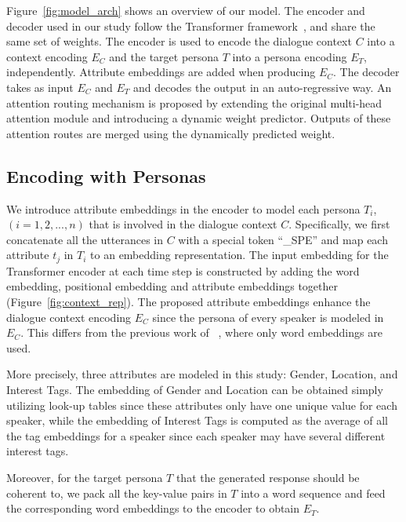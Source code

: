 \documentclass[letterpaper]{article}
\newcommand{\citet}[1]{\citeauthor{#1} \shortcite{#1}}
\newcommand{\citep}{\cite}
\begin{document}
Figure~\ref{fig:model_arch} shows an overview of our model. The encoder and decoder used in our study follow the Transformer framework~\citep{Vaswani2017Attention}, and share the same set of weights. The encoder is used to encode the dialogue context $C$ into a context encoding $E_C$ and the target persona $T$ into a persona encoding $E_T$, independently. Attribute embeddings are added when producing $E_C$. The decoder takes as input $E_C$ and $E_T$ and decodes the output in an auto-regressive way. An attention routing mechanism is proposed by extending the original multi-head attention module and introducing a dynamic weight predictor. Outputs of these attention routes are merged using the dynamically predicted weight.

\subsection{Encoding with Personas}\label{sec:att_embed}
We introduce attribute embeddings in the encoder to model each persona $T_i$, $(i = 1, 2, ..., n)$ that is involved in the dialogue context $C$. Specifically, we first concatenate all the utterances in $C$ with a special token ``\_SPE'' and map each attribute $t_j$ in $T_i$ to an embedding representation. The input embedding for the Transformer encoder at each time step is constructed by adding the word embedding, positional embedding and attribute embeddings together (Figure~\ref{fig:context_rep}). The proposed attribute embeddings enhance the dialogue context encoding $E_C$ since the persona of every speaker is modeled in $E_C$. This differs from the previous work of~\citet{golovanov-etal-2019-large}, where only word embeddings are used.

More precisely, three attributes are modeled in this study: Gender, Location, and Interest Tags. The embedding of Gender and Location can be obtained simply utilizing look-up tables since these attributes only have one unique value for each speaker, while the embedding of Interest Tags is computed as the average of all the tag embeddings for a speaker since each speaker may have several different interest tags.

Moreover, for the target persona $T$ that the generated response should be coherent to, we pack all the key-value pairs in $T$ into a word sequence and feed the corresponding word embeddings to the encoder to obtain $E_T$.
\end{document}
